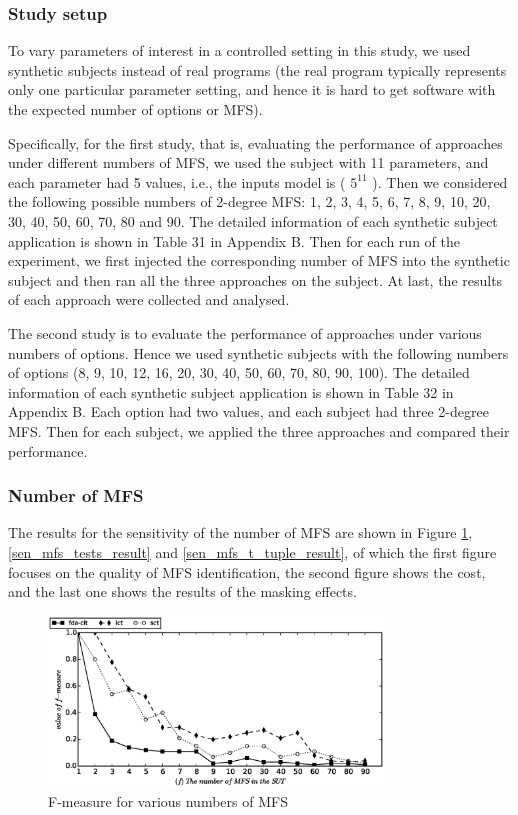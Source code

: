 \documentclass[journal,12pt,onecolumn,draftclsnofoot,]{IEEEtran}
\begin{document}
\subsubsection{Study setup}
To vary parameters of interest in a controlled setting in this study, we used synthetic subjects instead of real programs (the real program typically represents only one particular parameter setting, and hence it is hard to get software with the expected number of options or MFS).

Specifically, for the first study, that is, evaluating the performance of approaches under different numbers of MFS, we used the subject with 11 parameters, and each parameter had 5 values, i.e., the inputs model is ( $5^{11}$ ). Then we considered the following possible numbers of 2-degree MFS: 1, 2, 3, 4, 5, 6, 7, 8, 9, 10, 20, 30, 40, 50, 60, 70, 80 and 90. {\color{red}The detailed information of each synthetic subject application is shown in Table 31 in Appendix B.} Then for each run of the experiment, we first injected the corresponding number of MFS into the synthetic subject and then ran all the three approaches on the subject. At last, the results of each approach were collected and analysed.

The second study is to evaluate the performance of approaches under various numbers of options. Hence we used synthetic subjects with the following numbers of options (8, 9, 10, 12, 16, 20, 30, 40, 50, 60, 70, 80, 90, 100). {\color{red}The detailed information of each synthetic subject application is shown in Table 32 in Appendix B.} Each option had two values, and each subject had three 2-degree MFS. Then for each subject, we applied the three approaches and compared their performance.

\subsubsection{Number of MFS}\label{sec:emprical:numberofmfs}
The results for the sensitivity of the number of MFS are shown in Figure \ref{sen_mfs_f_measure_result},  \ref{sen_mfs_tests_result} and \ref{sen_mfs_t_tuple_result}, of which the first figure focuses on the quality of MFS identification,  the second figure shows the cost, and the last one shows the results of the masking effects.

\begin{figure}[htbp]
 \includegraphics[width=3.5in]{sens_mfs_f_measure.eps}
\caption{F-measure for various numbers of MFS}
\label{sen_mfs_f_measure_result}
\end{figure}
\end{document}
